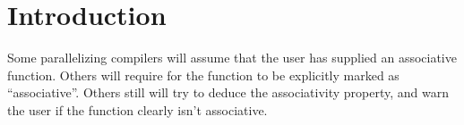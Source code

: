 \section{Introduction}

Some parallelizing compilers will assume that the user has supplied an
associative function. Others will require for the function to be explicitly
marked as ``associative''. Others still will try to deduce the associativity
property, and warn the user if the function clearly isn't associative.

